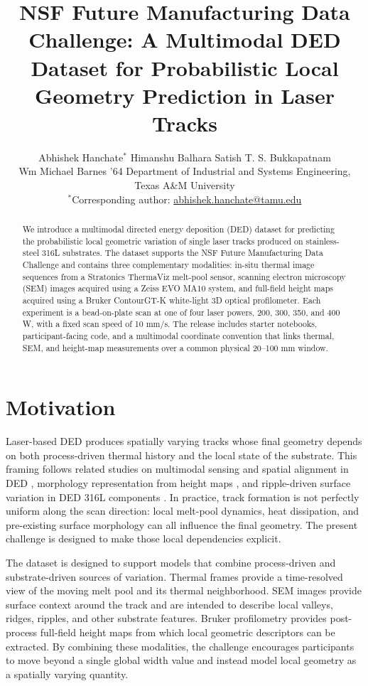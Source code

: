 \documentclass[10pt]{article}
\title{NSF Future Manufacturing Data Challenge: A Multimodal DED Dataset for Probabilistic Local Geometry Prediction in Laser Tracks}
\author{Abhishek Hanchate$^{\ast}$ \quad Himanshu Balhara \quad Satish T. S. Bukkapatnam\\
\small Wm Michael Barnes '64 Department of Industrial and Systems Engineering, Texas A\&M University\\
\small $^{\ast}$Corresponding author: \href{mailto:abhishek.hanchate@tamu.edu}{abhishek.hanchate@tamu.edu}}
\begin{document}
\maketitle

\begin{abstract}
We introduce a multimodal directed energy deposition (DED) dataset for predicting the probabilistic local geometric variation of single laser tracks produced on stainless-steel 316L substrates. The dataset supports the NSF Future Manufacturing Data Challenge and contains three complementary modalities: in-situ thermal image sequences from a Stratonics ThermaViz melt-pool sensor, scanning electron microscopy (SEM) images acquired using a Zeiss EVO MA10 system, and full-field height maps acquired using a Bruker ContourGT-K white-light 3D optical profilometer. Each experiment is a bead-on-plate scan at one of four laser powers, 200, 300, 350, and 400 W, with a fixed scan speed of 10 mm/s. The release includes starter notebooks, participant-facing code, and a multimodal coordinate convention that links thermal, SEM, and height-map measurements over a common physical 20--100 mm window.
\end{abstract}

\section{Motivation}
Laser-based DED produces spatially varying tracks whose final geometry depends on both process-driven thermal history and the local state of the substrate. This framing follows related studies on multimodal sensing and spatial alignment in DED \cite{hira2024,porosity2025}, morphology representation from height maps \cite{hanchate2026morphology}, and ripple-driven surface variation in DED 316L components \cite{balhara2023ripples}. In practice, track formation is not perfectly uniform along the scan direction: local melt-pool dynamics, heat dissipation, and pre-existing surface morphology can all influence the final geometry. The present challenge is designed to make those local dependencies explicit.

The dataset is designed to support models that combine process-driven and substrate-driven sources of variation. Thermal frames provide a time-resolved view of the moving melt pool and its thermal neighborhood. SEM images provide surface context around the track and are intended to describe local valleys, ridges, ripples, and other substrate features. Bruker profilometry provides post-process full-field height maps from which local geometric descriptors can be extracted. By combining these modalities, the challenge encourages participants to move beyond a single global width value and instead model local geometry as a spatially varying quantity.
\end{document}
